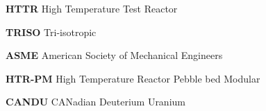 \documentclass[journal]{IEEEtran}
\begin{document}
\textbf{HTTR}  High Temperature Test Reactor  

\textbf{TRISO}  Tri-isotropic  

\textbf{ASME}  American Society of Mechanical Engineers  

\textbf{HTR-PM}  High Temperature Reactor Pebble bed Modular  

\textbf{CANDU} CANadian Deuterium Uranium

%
%



%
%
\end{document}
